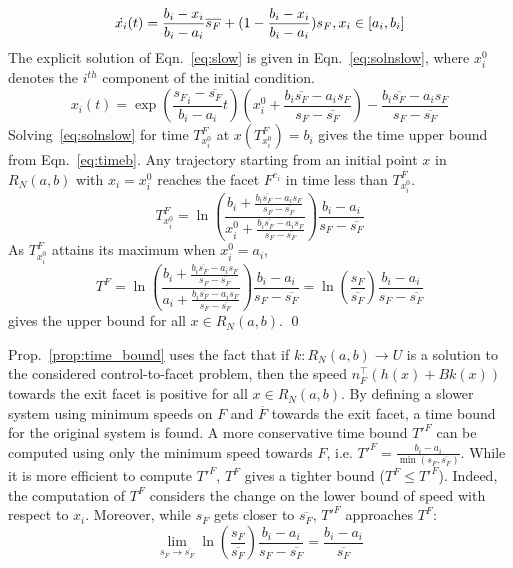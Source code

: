 \documentclass{ifacconf}
\newcommand{\RNab}{R_N(a,b)}
\begin{document}
	\begin{equation}\label{eq:slow}
		\dot{x_i}(t) = \frac{b_i - x_i}{b_i - a_i} \overline{ s_F} + (1-\frac{b_i - x_i}{b_i - a_i}) s_F, x_i \in [a_i, b_i]
	\end{equation}
	The explicit solution of Eqn.~\eqref{eq:slow} is given in Eqn.~\eqref{eq:solnslow}, where $x_i^0$ denotes the $i^{th}$ component of the initial condition.
	\begin{equation} \label{eq:solnslow}
		x_i(t) = \exp(  \frac{{s_F}_i - \overline{s_F}}{b_i - a_i}  t )(x_i^0 +  \frac{ b_i\overline{s_F }  - a_is_F} {s_F - \overline{s_F}  } ) -   \frac{ b_i\overline{s_F }  - a_is_F} {s_F - \overline{s_F}  } 
	\end{equation}
  	Solving~\eqref{eq:solnslow} for time $T^F_{x_i^0}$ at $x(T^F_{x_i^0}) = b_i$ gives the time upper bound from Eqn.~\eqref{eq:timeb}. Any trajectory starting from an initial point $x$ in $\RNab$ with $x_i = x_i^0$ reaches the facet $F^{e_i}$ in time less than $T^F_{x_i^0}$. 
	\begin{equation}\label{eq:timeb}
		T^F_{x_i^0} = \ln( \frac{ b_i + \frac{ b_i\overline{s_F}  - a_i s_F} {s_F - \overline{s_F}  } } { x_i^0 +  \frac{ b_i\overline{s_F}  - a_is_F} {s_F - \overline{s_F}  } } )\frac{b_i - a_i}{  s_F   - \overline{s_F}}
	\end{equation}
	As $T^F_{x_i^0}$ attains its maximum when $x_i^0 = a_i$,
	\begin{equation}
		T^F = \ln( \frac{ b_i + \frac{ b_i\overline{s_F }  - a_i s_F} {s_F - \overline{s_F}  } } { a_i +  \frac{ b_i\overline{s_F}  - a_i s_F} {s_F - \overline{s_F}  } } )\frac{b_i - a_i}{  s_F   - \overline{s_F}} = \ln( \frac{s_F}{\overline{s_F}})\frac{b_i - a_i}{  s_F   - \overline{s_F}}
	\end{equation}
	gives the upper bound for all $x \in \RNab$.
\qed
  
Prop.~\ref{prop:time_bound} uses the fact that if $k: \RNab \longrightarrow U$ is a solution to the considered control-to-facet problem, then the speed  $n_F^\top(h(x) + Bk(x))$ towards the exit facet is positive for all $x\in \RNab$. By defining a slower system using minimum speeds on $F$ and $\overline F$ towards the exit facet, a time bound for the original system is found. A more conservative time bound ${T'^F}$ can be computed using only the minimum speed towards $F$, i.e. ${T'^F} = \frac{b_i - a_i}{\min(s_F, \overline{s_F})}$. While it is more efficient to compute ${T'^F}$, $T^F$ gives a tighter bound ($T^F \leq {T'^F}$). Indeed, the computation of ${T^F}$ considers the change on the lower bound of speed with respect to $x_i$. Moreover, while $s_F$ gets closer to $\overline{s_F}$, $T'^F$ approaches $T^F$:
\begin{equation}
	\lim_{s_F \rightarrow \overline{s_F}} \ln( \frac{s_F}{\overline{s_F}})\frac{b_i - a_i}{  s_F   - \overline{s_F}} = \frac{ b_i - a_i}{\overline{s_F}}
\end{equation} 
\end{document}
